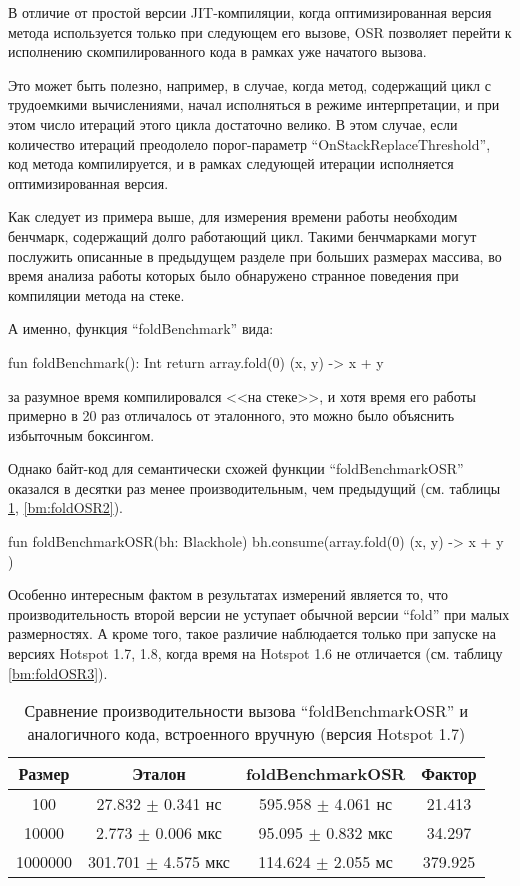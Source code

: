 В отличие от простой версии JIT-компиляции, когда оптимизированная версия метода используется
только при следующем его вызове, OSR позволяет перейти к исполнению скомпилированного кода в рамках
уже начатого вызова.

Это может быть полезно, например, в случае, когда метод, содержащий цикл с трудоемкими вычислениями,
начал исполняться в режиме интерпретации, и при этом число итераций этого цикла достаточно велико.
В этом случае, если количество итераций преодолело порог-параметр ``OnStackReplaceThreshold'',
код метода компилируется, и в рамках следующей итерации исполняется оптимизированная версия.

Как следует из примера выше, для измерения времени работы необходим бенчмарк, содержащий долго
работающий цикл.
Такими бенчмарками могут послужить описанные в предыдущем разделе при больших размерах массива,
во время анализа работы которых было обнаружено странное поведения при компиляции метода на стеке.

А именно, функция ``foldBenchmark'' вида:
\begin{pyglist}[language=kotlin]
    fun foldBenchmark(): Int {
        return array.fold(0) { (x, y) -> x + y }
    }
\end{pyglist}

за разумное время компилировался <<на стеке>>, и хотя время его работы примерно в 20 раз
отличалось от эталонного, это можно было объяснить избыточным боксингом.

Однако байт-код для семантически схожей функции ``foldBenchmarkOSR'' оказался в десятки раз менее
производительным, чем предыдущий (см. таблицы \ref{bm:foldOSR}, \ref{bm:foldOSR2}).
\begin{pyglist}[language=kotlin]
    fun foldBenchmarkOSR(bh: Blackhole) {
        bh.consume(array.fold(0) { (x, y) -> x + y })
    }
\end{pyglist}

Особенно интересным фактом в результатах измерений является то, что производительность второй
версии не уступает обычной версии ``fold'' при малых размерностях.
А кроме того, такое различие наблюдается только при запуске на версиях Hotspot 1.7, 1.8, когда
время на Hotspot 1.6 не отличается (см. таблицу \ref{bm:foldOSR3}).

\begin{table}[h]
\begin{center}
\begin{tabular}{|c|c|c|c|} \hline
Размер & Эталон & foldBenchmarkOSR & Фактор \\ \hline
100 & 27.832 $\pm$ 0.341 нс & 595.958 $\pm$ 4.061 нс & 21.413\\ \hline
10000 & 2.773 $\pm$ 0.006 мкс & 95.095 $\pm$ 0.832 мкс & 34.297\\ \hline
1000000 & 301.701 $\pm$ 4.575 мкс & 114.624 $\pm$ 2.055 мс & 379.925\\ \hline
\end{tabular}
\caption{Сравнение производительности вызова ``foldBenchmarkOSR'' и аналогичного кода, встроенного вручную (версия Hotspot 1.7)}
\label{bm:foldOSR}
\end{center}
\end{table}

